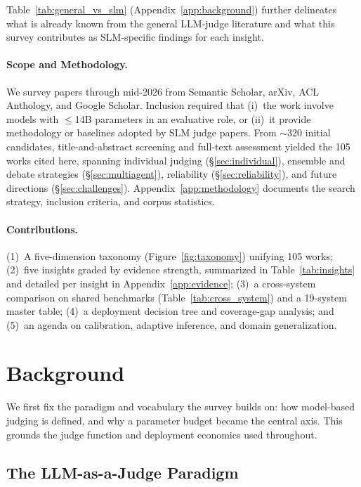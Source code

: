 \documentclass[11pt]{article}
\begin{document}


Table~\ref{tab:general_vs_slm} (Appendix~\ref{app:background}) further delineates what is already known from the general LLM-judge literature and what this survey contributes as SLM-specific findings for each insight.

\paragraph{Scope and Methodology.} We survey papers through mid-2026 from Semantic Scholar, arXiv, ACL Anthology, and Google Scholar. Inclusion required that (i)~the work involve models with $\leq$14B parameters in an evaluative role, or (ii)~it provide methodology or baselines adopted by SLM judge papers. From $\sim$320 initial candidates, title-and-abstract screening and full-text assessment yielded the 105 works cited here, spanning individual judging (\S\ref{sec:individual}), ensemble and debate strategies (\S\ref{sec:multiagent}), reliability (\S\ref{sec:reliability}), and future directions (\S\ref{sec:challenges}). Appendix~\ref{app:methodology} documents the search strategy, inclusion criteria, and corpus statistics.

\paragraph{Contributions.} (1)~A five-dimension taxonomy (Figure~\ref{fig:taxonomy}) unifying 105 works; (2)~five insights graded by evidence strength, summarized in Table~\ref{tab:insights} and detailed per insight in Appendix~\ref{app:evidence}; (3)~a cross-system comparison on shared benchmarks (Table~\ref{tab:cross_system}) and a 19-system master table; (4)~a deployment decision tree and coverage-gap analysis; and (5)~an agenda on calibration, adaptive inference, and domain generalization.



\section{Background}
\label{sec:background}

We first fix the paradigm and vocabulary the survey builds on: how model-based judging is defined, and why a parameter budget became the central axis. This grounds the judge function and deployment economics used throughout.

\subsection{The LLM-as-a-Judge Paradigm}
\end{document}
